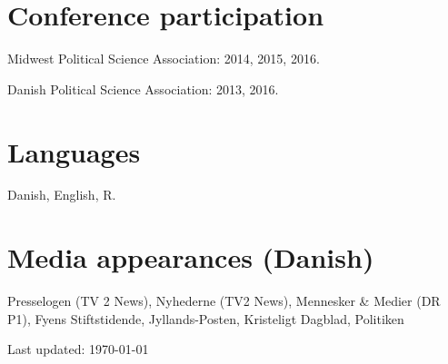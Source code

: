 \documentclass[a4paper,10pt]{article}
\begin{document}
\vspace{.7em}
\section{Conference participation}
Midwest Political Science Association: 2014, 2015, 2016.

Danish Political Science Association: 2013, 2016.

\vspace{.7em}
\section{Languages}
Danish, English, R.

\vspace{.7em}
\section{Media appearances (Danish)}
Presselogen (TV 2 News), Nyhederne (TV2 News), Mennesker \& Medier (DR P1), Fyens Stiftstidende, Jyllands-Posten, Kristeligt Dagblad, Politiken

\vspace{1em}
\begin{center}
Last updated: \today
\end{center}
\end{document}
